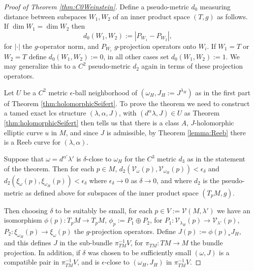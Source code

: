 \documentclass{amsart}
\numberwithin{equation}{section}
\theoremstyle{definition}
\theoremstyle{remark}
\begin{document}
\begin{proof} [Proof of Theorem \ref{thm:C0Weinstein}]
   Define a pseudo-metric $d _{0} $ measuring distance between subspaces $W _{1}, W _{2}  $ of an inner product space $(T,g)$ as follows. If $\dim W_1 = \dim W _{2} $ then $$d _{0} (W _{1}, W _{2}  ) := |P _{W _{1} } - P _{W _{2} }  |, $$ for $|\cdot|$ the $g$-operator norm, and $P _{W _{i} } $ $g$-projection operators onto $W _{i} $. If $W _{1} =T $ or $W _{2} =T $ define $d _{0} (W _{1}, W _{2}  ) :=0 $, in all other cases set $d _{0} (W _{1}, W _{2}) := 1 $. We may generalize this to a $C ^{2}$ pseudo-metric $d _{2} $ again in terms of these projection operators.

Let $U$ be a $C ^{2} $  metric $\epsilon$-ball neighborhood of $(\omega _{H}, J _{H}:= J ^{\lambda _{H}})$ as in the first part of Theorem \ref{thm:holomorphicSeifert}. To prove the theorem we need to construct a tamed exact lcs structure $(\lambda, \alpha, J)$, with $(d ^{\alpha} \lambda,J ) \in U$ as Theorem \ref{thm:holomorphicSeifert} then tells us that there is a class $A$, $J$-holomorphic elliptic curve $u$ in $M$, and since $J$ is admissible, by Theorem \ref{lemma:Reeb} there is a Reeb curve for $(\lambda, \alpha)$.

Suppose that $\omega = d ^{\alpha'} \lambda' $ is $\delta$-close to $\omega _{H} $ for the $C ^{3} $ metric $d _{3} $ as in the statement of the theorem.
Then for each $p \in M$, $d _{2} (\mathcal{V} _{\omega} (p), \mathcal{V} _{\omega _{H}} (p)) < \epsilon _{\delta}  $ and  $d _{2} (\xi _{\omega} (p), \xi _{\omega _{H}} (p)) < \epsilon _{\delta}  $  where $\epsilon _{\delta} \to 0 $ as $\delta \to 0$, and where $d _{2} $ is the pseudo-metric as defined above for subspaces of the inner product space $(T _{p} M,g) $.

   
Then choosing $\delta$ to be suitably be small, for each $p \in V:=\mathcal{V} (M,\lambda')$ we have an isomorphism $\phi (p): T _{p} M \to T _{p} M   $, $\phi _{p}:= P _{1} \oplus P _{2}   $, for $P _{1}: \mathcal{V}_ {\lambda _{H} } (p) \to \mathcal{V} _{\lambda'} (p) $, $P _{2}: \xi _{\omega _{H}} (p) \to \xi _{\omega} (p)   $ the $g$-projection operators. 
Define $J (p):= \phi (p)_*J _{H}  $, and this defines $J$ in the sub-bundle $\pi _{TM} ^{-1} V$, for $\pi _{TM}: TM \to M $ the bundle projection. In addition, if $\delta$ was chosen to be sufficiently small $(\omega,J)$ is a compatible pair in $\pi _{TM} ^{-1} V$, and is $\epsilon$-close to $(\omega _{H}, J _{H}  )$ in $\pi _{TM} ^{-1} V$.


\end{proof}
\end{document}
